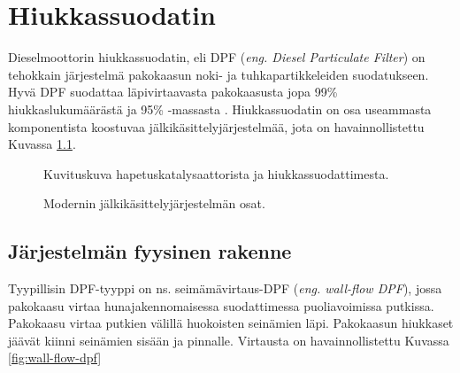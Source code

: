 \chapter{Hiukkassuodatin}%
\label{ch:dpf}



Dieselmoottorin hiukkassuodatin, eli DPF (\emph{eng. Diesel Particulate Filter}) on tehokkain järjestelmä pakokaasun noki- ja tuhkapartikkeleiden suodatukseen. 
Hyvä DPF suodattaa läpivirtaavasta pakokaasusta jopa 99\% hiukkaslukumäärästä ja 95\% -massasta \cite{Yan_state_of_the_art}. Hiukkassuodatin on osa useammasta komponentista koostuvaa jälkikäsittelyjärjestelmää, jota on havainnollistettu Kuvassa \ref{fig:EAT_full}. %

\begin{figure}[H]
    \centering
                {Kuvituskuva hapetuskatalysaattorista ja hiukkassuodattimesta.}
    \caption{Modernin jälkikäsittelyjärjestelmän osat.}
    \label{fig:EAT_full}
\end{figure}



\section{Järjestelmän fyysinen rakenne}

Tyypillisin DPF-tyyppi on ns. seimämävirtaus-DPF (\emph{eng. wall-flow DPF}), jossa pakokaasu virtaa hunajakennomaisessa suodattimessa puoliavoimissa putkissa. Pakokaasu virtaa putkien välillä huokoisten seinämien läpi. Pakokaasun hiukkaset jäävät kiinni seinämien sisään ja pinnalle. Virtausta on havainnollistettu Kuvassa \ref{fig:wall-flow-dpf}  



